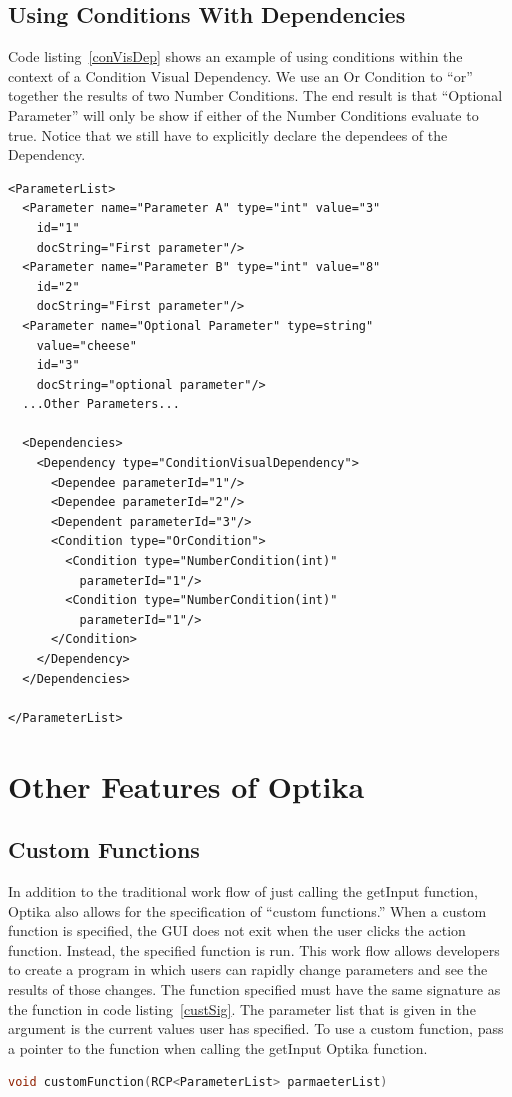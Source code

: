\subsection{Using Conditions With Dependencies}
Code listing~\ref{conVisDep} shows an example of using conditions within the context of a Condition Visual Dependency.
We use an Or Condition to ``or'' together the results of two Number Conditions. The end result is that ``Optional Parameter'' 
will only be show if either of the Number Conditions evaluate to true. Notice that we still have to explicitly declare
the dependees of the Dependency.
\begin{lstlisting}[caption={Example usage of a Condition Visual Dependency}, label=conVisDep]
<ParameterList>
  <Parameter name="Parameter A" type="int" value="3"
    id="1"
    docString="First parameter"/>
  <Parameter name="Parameter B" type="int" value="8"
    id="2"
    docString="First parameter"/>
  <Parameter name="Optional Parameter" type=string"
    value="cheese"
    id="3"
    docString="optional parameter"/>
  ...Other Parameters...

  <Dependencies>
    <Dependency type="ConditionVisualDependency">
      <Dependee parameterId="1"/>
      <Dependee parameterId="2"/>
      <Dependent parameterId="3"/>
      <Condition type="OrCondition">
        <Condition type="NumberCondition(int)" 
          parameterId="1"/>
        <Condition type="NumberCondition(int)"
          parameterId="1"/>
      </Condition>
    </Dependency>
  </Dependencies>

</ParameterList>
\end{lstlisting}

\section{Other Features of Optika}
\subsection{Custom Functions}
In addition to the traditional work flow of just calling the getInput function, Optika also allows for the specification of ``custom functions.''
When a custom function is specified, the GUI does not exit when the user clicks the action function. Instead, the specified function is run. This work flow allows developers 
to create a program in which users can rapidly change parameters and see the results of those changes. The function specified must have the same signature as the function 
in code listing~\ref{custSig}. The parameter list that is given in the argument is the current values user has specified. To use a custom function, pass a pointer to the
function when calling the getInput Optika function.
\begin{lstlisting}[language=C++, caption={The signature all custom functions must have}, label=custSig]
void customFunction(RCP<ParameterList> parmaeterList)
\end{lstlisting}

